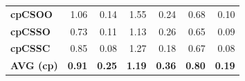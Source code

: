 \documentclass[encoding=utf8,british]{tumphthesis}
\begin{document}
\begin{table}[H]
\begin{subtable}{1.0\textwidth}
{\begin{tabular}{|l|rr|rr|rr|}
\textbf{cpCSOO}   & 1.06                                                     & 0.14                                                       & 1.55                                                     & 0.24                                                       & 0.68                                                     & 0.10                                                       \\
\textbf{cpCSSO}   & 0.73                                                     & 0.11                                                       & 1.13                                                     & 0.26                                                       & 0.65                                                     & 0.09                                                       \\
\rowcolor[HTML]{CFE2F3} 
\textbf{cpCSSC}   & 0.85                                                     & 0.08                                                       & 1.27                                                     & 0.18                                                       & 0.67                                                     & 0.08                                                       \\ \hline
\textbf{AVG (cp)} & \textbf{0.91}                                            & \textbf{0.25}                                              & \textbf{1.19}                                            & \textbf{0.36}                                              & \textbf{0.80}                                            & \textbf{0.19}                            \\ \hline
\end{tabular}}
\end{subtable}


    \bigskip
    \hfill


\end{table}
\end{document}
